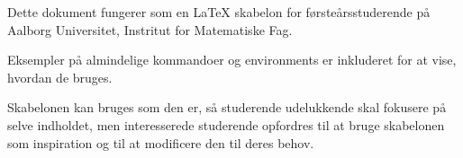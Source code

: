 

Dette dokument fungerer som en \LaTeX{} skabelon for førsteårsstuderende på Aalborg Universitet, Instritut for Matematiske Fag.

Eksempler på almindelige kommandoer og environments er inkluderet for at vise, hvordan de bruges.

Skabelonen kan bruges som den er, så studerende udelukkende skal fokusere på selve indholdet, men interesserede studerende opfordres til at bruge skabelonen som inspiration og til at modificere den til deres behov.
